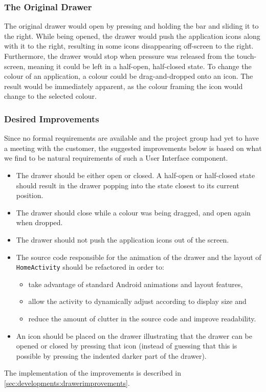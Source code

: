 \subsubsection{The Original Drawer}

The original drawer would open by pressing and holding the bar and sliding it to the right.
While being opened, the drawer would push the application icons along with it to the right, resulting in some icons disappearing off-screen to the right.
Furthermore, the drawer would stop when pressure was released from the touch-screen, meaning it could be left in a half-open, half-closed state.
To change the colour of an application, a colour could be drag-and-dropped onto an icon. 
The result would be immediately apparent, as the colour framing the icon would change to the selected colour.

\subsubsection{Desired Improvements}

Since no formal requirements are available and the project group had yet to have a meeting with the customer, the suggested improvements below is based on what we find to be natural requirements of such a User Interface component. 

\begin{itemize}
\item The drawer should be either open or closed. A half-open or half-closed state should result in the drawer popping into the state closest to its current position.
\item The drawer should close while a colour was being dragged, and open again when dropped.
\item The drawer should not push the application icons out of the screen.
\item The source code responsible for the animation of the drawer and the layout of \lstinline{HomeActivity} should be refactored in order to:
\begin{itemize}
\item take advantage of standard Android animations and layout features,
\item allow the activity to dynamically adjust according to display size and
\item reduce the amount of clutter in the source code and improve readability.
\end{itemize}
\item An icon should be placed on the drawer illustrating that the drawer can be opened or closed by pressing that icon (instead of guessing that this is possible by pressing the indented darker part of the drawer).
\end{itemize}

The implementation of the improvements is described in \cref{sec:developments:drawerimprovements}.